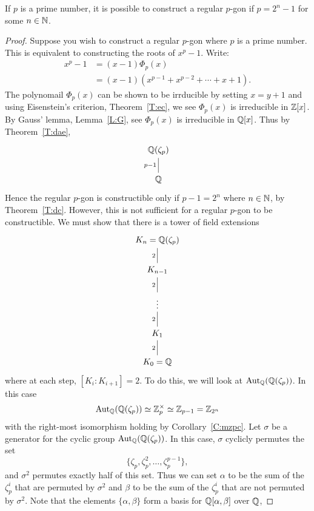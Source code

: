 \documentclass{ximera}
\begin{document}
\begin{theorem}
  If $p$ is a prime number, it is possible to construct a regular
  $p$-gon if $p= 2^n-1$ for some $n\in \mathbb N$.
  \begin{proof}
    Suppose you wish to construct a regular $p$-gon where $p$ is a
    prime number. This is equivalent to constructing the roots of
    $x^p-1$. Write:
    \begin{align*}
      x^{p} -1 &= (x-1) \Phi_{p}(x)\\
      &= (x-1)(x^{p-1} + x^{p-2} + \cdots + x+1).
    \end{align*}
    The polynomail $\Phi_{p}(x)$ can be shown to be irrducible by
    setting $x = y+1$ and using Eisenstein's criterion,
    Theorem~\ref{T:ec}, we see $\Phi_{p}(x)$ is irreducible in
    $\mathbb Z[x]$. By Gauss' lemma, Lemma~\ref{L:G}, see $\Phi_{p}(x)$ is
    irreducible in $\mathbb Q[x]$. Thus by Theorem~\ref{T:dae}, 
    \[
    \begin{tikzcd}
      \Q(\zeta_{p})\\
      \Q\ar[u, -, "p-1"]
    \end{tikzcd}
    \]
    Hence the regular $p$-gon is constructible only if $p-1 = 2^n$
    where $n\in \mathbb N$, by Theorem~\ref{T:dc}. However, this is not
    sufficient for a regular $p$-gon to be constructible. We must show
    that there is a tower of field extensions 
    \[
    \begin{tikzcd}
      K_n=\Q(\zeta_{p})\\
      K_{n-1}\ar[u, -, "2"]\\
      \vdots\ar[u, -, "2"]\\
      K_1\ar[u, -, "2"]\\
      K_0=\Q\ar[u, -, "2"]
    \end{tikzcd}
    \]
    where at each step, $[K_i:K_{i+1}]=2$. To do this, we will look at
    $\operatorname{Aut}_\mathbb Q(\mathbb Q(\zeta_p))$. In this case
    \[
    \operatorname{Aut}_\mathbb Q(\mathbb Q(\zeta_p))\simeq\mathbb Z_p^\times \simeq \mathbb Z_{p-1} = \mathbb Z_{2^n}
    \]
    with the right-most isomorphism holding by
    Corollary~\ref{C:mzpc}. Let $\sigma$ be a generator for the cyclic
    group $\operatorname{Aut}_\mathbb Q(\mathbb Q(\zeta_p))$. In this case, $\sigma$ cyclicly permutes the set
    \[
    \{\zeta_p,\zeta_p^2,\dots,\zeta_p^{p-1}\},
    \]
    and $\sigma^2$ permutes exactly half of this set. Thus we can set
    $\alpha$ to be the sum of the $\zeta_p^i$ that are permuted by
    $\sigma^2$ and $\beta$ to be the sum of the $\zeta_p^i$ that are
    not permuted by $\sigma^2$.  Note that the elements
    $\{\alpha,\beta\}$ form a basis for $\mathbb Q[\alpha,\beta]$ over $\mathbb Q$,

\end{proof}
\end{theorem}
\end{document}

